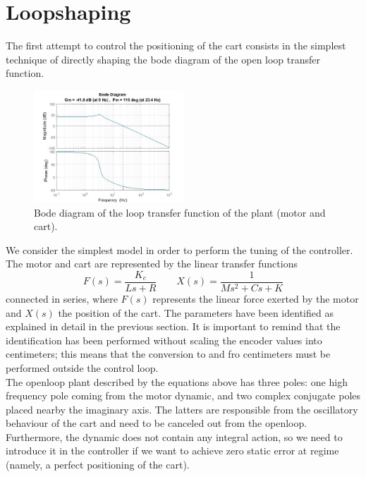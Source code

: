\section{Loopshaping}
The first attempt to control the positioning of the cart consists in the simplest technique of directly shaping the bode diagram of the open loop transfer function. 

\begin{figure}[h]
\centering
\includegraphics[width=0.5\textwidth]{img/ls_bode_ol.jpg}
\caption{Bode diagram of the loop transfer function of the plant (motor and cart).}
\end{figure}

We consider the simplest model in order to perform the tuning of the controller. The motor and cart are represented by the linear transfer functions 
\begin{equation}
F(s) = \frac{K_e}{Ls+R} \qquad X(s) = \frac{1}{Ms^2+Cs+K}
\end{equation}
connected in series, where $F(s)$ represents the linear force exerted by the motor and $X(s)$ the position of the cart. The parameters have been identified as explained in detail in the previous section. It is important to remind that the identification has been performed without scaling the encoder values into centimeters; this means that the conversion to and fro centimeters must be performed outside the control loop.\\

The openloop plant described by the equations above has three poles: one high frequency pole coming from the motor dynamic, and two complex conjugate poles placed nearby the imaginary axis. The latters are responsible from the oscillatory behaviour of the cart and need to be canceled out from the openloop. Furthermore, the dynamic does not contain any integral action, so we need to introduce it in the controller if we want to achieve zero static error at regime (namely, a perfect positioning of the cart).\\

